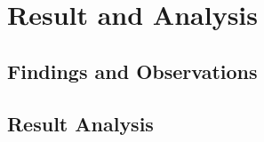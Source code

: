 \chapter{Result and Analysis}
\section{Findings and Observations}
\lipsum[1]
\lipsum[2]
\section{Result Analysis}
\lipsum[1]
\lipsum[2]

